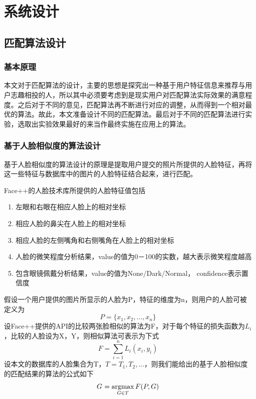 
\chapter{系统设计}

\section{匹配算法设计}

\subsection{基本原理}
本文对于匹配算法的设计，主要的思想是探究出一种基于用户特征信息来推荐与用户志趣相投的人，所以其中必须要考虑到是现实用户对匹配算法实际效果的满意程度。之后对于不同的意见，匹配算法再不断进行对应的调整，从而得到一个相对最优的算法。故此，本文准备设计不同的匹配算法。最后对于不同的匹配算法进行实验，选取出实验效果最好的来当作最终实施在应用上的算法。
\subsection{基于人脸相似度的算法设计}

基于人脸相似度的算法设计的原理是提取用户提交的照片所提供的人脸特征，再将这一些特征与数据库中的图片的人脸特征结合起来，进行匹配。

Face++的人脸技术库所提供的人脸特征值包括
\begin{enumerate}
\item 左眼和右眼在相应人脸上的相对坐标
\item 相应人脸的鼻尖在人脸上的相对坐标
\item 相应人脸的左侧嘴角和右侧嘴角在人脸上的相对坐标
\item 人脸的微笑程度分析结果，value的值为0－100的实数，越大表示微笑程度越高
\item 包含眼镜佩戴分析结果，value的值为None/Dark/Normal， confidence表示置信度
\end{enumerate}
假设一个用户提供的图片所显示的人脸为P，特征的维度为n，则用户的人脸可被定义为
\begin{equation*}
P=\{x_1,x_2,\ldots,x_n\}
\end{equation*}
设Face++提供的API的比较两张脸相似的算法为F，对于每个特征的损失函数为$L_i$，比较的人脸设为X，Y，则相似算法可表示为下式
\begin{equation*}
F=\sum_{i=1}^n L_i(x_i, y_i)
\end{equation*}
设本文的数据库的人脸集合为T，$T={T_1,T_2,\ldots}$，则我们能给出的基于人脸相似度的匹配结果的算法的公式如下
\begin{equation*}
G^{\*} = \mathop{\argmax_{G \in T}}{F(P,G)}
\end{equation*}

